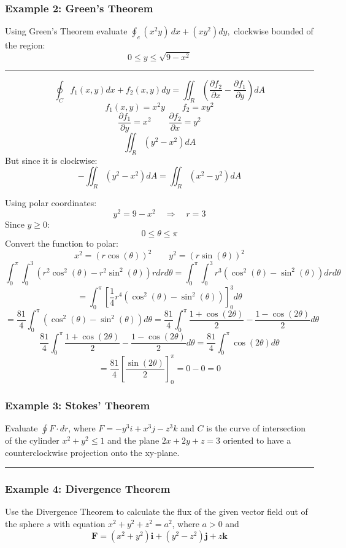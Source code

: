 \subsubsection{Example 2: Green's Theorem}
Using Green's Theorem evaluate $\oint_{e}(x^{2}y)\,d x+(x y^{2})d y,$ clockwise bounded of the region:
$$0\leq y\leq{\sqrt{9-x^{2}}}$$

\rule{\textwidth}{1pt}

$$\oint_{ C } f_1(x, y) d x+f_2(x, y) d y=\iint_{ R }\left(\frac{\partial f_2}{\partial x}-\frac{\partial f_1}{\partial y}\right) d A$$
$$f_1(x,y)=x^2y\qquad f_2=xy^2$$
$$\frac{\partial f_1}{\partial y}=x^2 \qquad \frac{\partial f_2}{\partial x}=y^2$$
$$\iint_{ R }\left(y^2-x^2\right) d A$$
But since it is clockwise:
$$-\iint_{ R }\left(y^2-x^2\right) d A=\iint_{ R }\left(x^2-y^2\right) d A$$

Using polar coordinates:
$$y^2=9-x^2\quad\Rightarrow\quad r=3$$
Since $y\geq 0$:
$$0\leq\theta\leq\pi$$
Convert the function to polar:
$$x^2=(r\cos(\theta))^2\qquad y^2=(r\sin(\theta))^2$$
$$\int_0^\pi\int_0^3(r^2\cos^2(\theta)-r^2\sin^2(\theta))rdrd\theta =\int_0^\pi\int_0^3r^3(\cos^2(\theta)-\sin^2(\theta))drd\theta$$
$$=\int_0^\pi\left[\frac{1}{4}r^4(\cos^2(\theta)-\sin^2(\theta))\right]_0^3d\theta$$
$$=\frac{81}{4}\int_0^\pi(\cos^2(\theta)-\sin^2(\theta))d\theta=\frac{81}{4}\int_0^\pi\frac{1+\cos(2\theta)}{2}-\frac{1-\cos(2\theta)}{2} d\theta$$
$$\frac{81}{4}\int_0^\pi\frac{1+\cos(2\theta)}{2}-\frac{1-\cos(2\theta)}{2} d\theta=\frac{81}{4}\int_0^\pi \cos(2\theta) d\theta$$
$$=\frac{81}{4}\left[\frac{\sin(2\theta)}{2}\right]_0^\pi=0-0=0$$


\subsubsection{Example 3: Stokes' Theorem}
Evaluate $\oint F\cdot dr$, where $F=-y^3i+x^3j-z^3k$ and $C$ is the curve of intersection of the cylinder
$x^2+y^2\leq 1$ and the plane $2x+2y+z=3$ oriented to have a counterclockwise projection onto the xy-plane.

\rule{\textwidth}{1pt}

\subsubsection{Example 4: Divergence Theorem}
Use the Divergence Theorem to calculate the flux of the given vector field out
of the sphere $s$ with equation $x^2 + y^2 + z^2 = a^2$, where $a > 0$ and
$$\mathbf{F}=(x^{2}+y^{2})\mathbf{i}+(y^{2}-z^{2})\mathbf{j}+z\mathbf{k}$$
